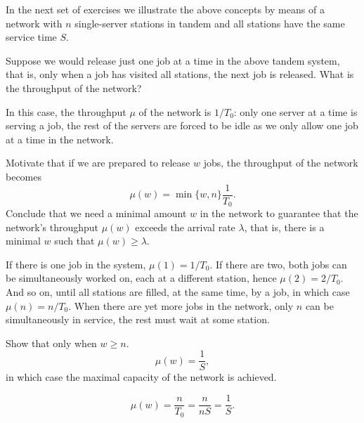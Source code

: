 In the next set of exercises we illustrate the above concepts by means of a network with $n$ single-server stations in tandem and all stations have the same service time $S$. 

\begin{exercise}
Suppose we would release just one job at a time in the above tandem system, that is, only when a job has visited all stations, the next job is released. What is the throughput of the network?
\begin{solution}
In this case, the throughput $\mu$ of the network is $1/T_0$: only one server at a time is serving a job, the rest of the servers are forced to be idle as we only allow one job at a time in the network. 
\end{solution}
\end{exercise}

\begin{exercise}
Motivate that if we are prepared to release $w$ jobs, the throughput of the network becomes
\begin{equation*}
 \mu(w) = \min\{w, n\} \frac 1{T_0}.
\end{equation*}
Conclude that we need a minimal amount $w$ in the network to guarantee that
the network's throughput $\mu(w)$ exceeds the arrival rate $\lambda$, that is, there is a minimal $w$ such that $\mu(w) \geq \lambda$.
\begin{solution}
If there is one job in the system, $\mu(1) = 1/T_0$. If there are two, both jobs can be simultaneously worked on, each at a different station, hence $\mu(2)=2/T_0$. And so on, until all stations are filled, at the same time, by a job, in which case $\mu(n) = n/T_0$. When there are yet more jobs in the network, only $n$ can be simultaneously in service, the rest must wait at some station.
\end{solution}
\end{exercise}


\begin{exercise}
Show that only when $w\geq n$.
\begin{equation*}
\mu(w) = \frac 1S,
\end{equation*}
in which case the maximal capacity of the network is achieved.
\begin{solution}
\begin{equation*}
 \mu(w) = \frac{n}{T_0} = \frac{n}{n S} = \frac 1S.
\end{equation*}
\end{solution}
\end{exercise}

